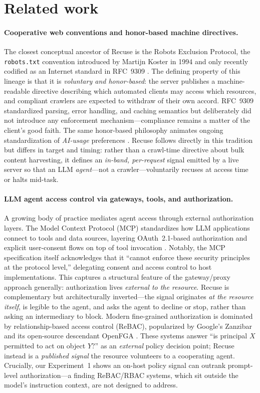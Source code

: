 \documentclass{article}
\begin{document}
\section{Related work}
\label{sec:related}

\paragraph{Cooperative web conventions and honor-based machine directives.}
The closest conceptual ancestor of Recuse is the Robots Exclusion Protocol, the
\texttt{robots.txt} convention introduced by Martijn Koster in 1994 and only
recently codified as an Internet standard in RFC~9309 \citep{rfc9309}. The
defining property of this lineage is that it is \emph{voluntary and honor-based}:
the server publishes a machine-readable directive describing which automated
clients may access which resources, and compliant crawlers are expected to
withdraw of their own accord. RFC~9309 standardized parsing, error handling, and
caching semantics but deliberately did not introduce any enforcement
mechanism---compliance remains a matter of the client's good faith. The same
honor-based philosophy animates ongoing standardization of \emph{AI-usage}
preferences \citep{aipref-attach}. Recuse follows directly in this tradition but
differs in target and timing: rather than a crawl-time directive about bulk
content harvesting, it defines an \emph{in-band, per-request} signal emitted by a
live server so that an LLM \emph{agent}---not a crawler---voluntarily recuses at
access time or halts mid-task.

\paragraph{LLM agent access control via gateways, tools, and authorization.}
A growing body of practice mediates agent access through external authorization
layers. The Model Context Protocol (MCP) standardizes how LLM applications
connect to tools and data sources, layering OAuth~2.1-based authorization and
explicit user-consent flows on top of tool invocation \citep{mcp2025}. Notably,
the MCP specification itself acknowledges that it ``cannot enforce these security
principles at the protocol level,'' delegating consent and access control to host
implementations. This captures a structural feature of the gateway/proxy approach
generally: authorization lives \emph{external to the resource}. Recuse is
complementary but architecturally inverted---the signal originates \emph{at the
resource itself}, is legible to the agent, and asks the agent to decline or stop,
rather than asking an intermediary to block. Modern fine-grained authorization is
dominated by relationship-based access control (ReBAC), popularized by Google's
Zanzibar \citep{pang2019zanzibar} and its open-source descendant OpenFGA
\citep{openfga}. These systems answer ``is principal $X$ permitted to act on
object $Y$?'' as an \emph{external} policy decision point; Recuse instead is a
\emph{published signal} the resource volunteers to a cooperating agent.
Crucially, our Experiment~1 shows an on-host policy signal can outrank
prompt-level authorization---a finding ReBAC/RBAC systems, which sit outside the
model's instruction context, are not designed to address.
\end{document}
